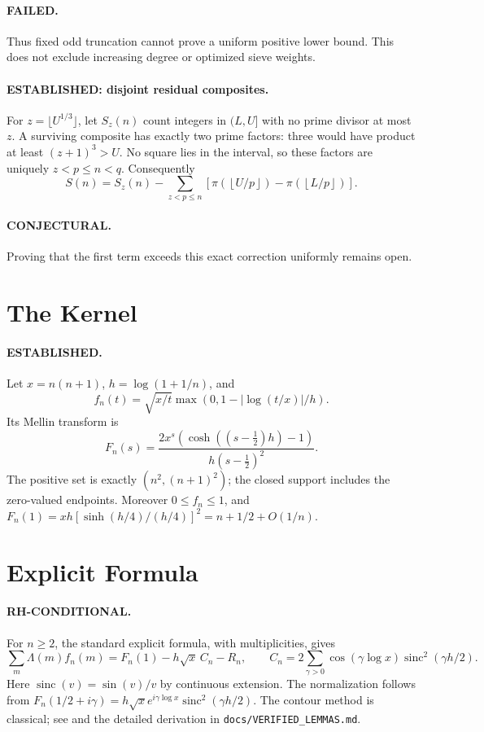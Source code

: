 \documentclass[11pt]{article}
\begin{document}
\paragraph{FAILED.}
Thus fixed odd truncation cannot prove a uniform positive lower bound.
This does not exclude increasing degree or optimized sieve weights.

\paragraph{ESTABLISHED: disjoint residual composites.}
For $z=\lfloor U^{1/3}\rfloor$, let $S_z(n)$ count integers in $(L,U]$
with no prime divisor at most $z$. A surviving composite has exactly two
prime factors: three would have product at least $(z+1)^3>U$.
No square lies in the interval, so these factors are uniquely
$z<p\le n<q$. Consequently
\[
S(n)=S_z(n)-\sum_{z<p\le n}
 \left[\pi\left(\left\lfloor U/p\right\rfloor\right)
       -\pi\left(\left\lfloor L/p\right\rfloor\right)\right].
\]
\paragraph{CONJECTURAL.}
Proving that the first term exceeds this exact correction uniformly remains open.

\section{The Kernel}
\paragraph{ESTABLISHED.}
Let \(x=n(n+1)\), \(h=\log(1+1/n)\), and
\[
f_n(t)=\sqrt{x/t}\max(0,1-|\log(t/x)|/h).
\]
Its Mellin transform is
\[
F_n(s)=\frac{2x^s(\cosh((s-\tfrac12)h)-1)}
{h(s-\tfrac12)^2}.
\]
The positive set is exactly $(n^2,(n+1)^2)$; the closed support includes
the zero-valued endpoints. Moreover $0\le f_n\le1$, and
$F_n(1)=xh[\sinh(h/4)/(h/4)]^2=n+1/2+O(1/n)$.

\section{Explicit Formula}
\paragraph{RH-CONDITIONAL.}
For $n\ge2$, the standard explicit formula, with multiplicities, gives
\[
\sum_m\Lambda(m)f_n(m)
=F_n(1)-h\sqrt{x}\,C_n-R_n,
\qquad C_n=2\sum_{\gamma>0}\cos(\gamma\log x)
 \operatorname{sinc}^2(\gamma h/2).
\]
Here $\operatorname{sinc}(v)=\sin(v)/v$ by continuous extension.
The normalization follows from
$F_n(1/2+i\gamma)=h\sqrt{x}e^{i\gamma\log x}\operatorname{sinc}^2(\gamma h/2)$.
The contour method is classical; see \cite{dgm} and the detailed derivation
in \texttt{docs/VERIFIED\_LEMMAS.md}.
\end{document}
